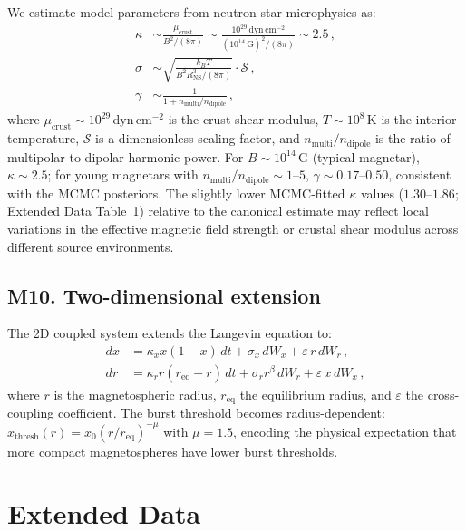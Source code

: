 \documentclass[twocolumn]{article}
\begin{document}
We estimate model parameters from neutron star microphysics as:
\begin{align}
\kappa &\sim \frac{\mu_{\mathrm{crust}}}{B^2/(8\pi)} \sim \frac{10^{29}\,\mathrm{dyn\,cm^{-2}}}{(10^{14}\,\mathrm{G})^2/(8\pi)} \sim 2.5\,,
\tag{M9}\\
\sigma &\sim \sqrt{\frac{k_B T}{B^2 R_{\mathrm{NS}}^3 /(8\pi)}} \cdot \mathcal{S}\,,
\tag{M10}\\
\gamma &\sim \frac{1}{1 + n_{\mathrm{multi}}/n_{\mathrm{dipole}}}\,,
\tag{M11}
\end{align}
where $\mu_{\mathrm{crust}} \sim 10^{29}$\,dyn\,cm$^{-2}$ is the crust shear modulus, $T \sim 10^8$\,K is the interior temperature, $\mathcal{S}$ is a dimensionless scaling factor, and $n_{\mathrm{multi}}/n_{\mathrm{dipole}}$ is the ratio of multipolar to dipolar harmonic power. For $B \sim 10^{14}$\,G (typical magnetar), $\kappa \sim 2.5$; for young magnetars with $n_{\mathrm{multi}}/n_{\mathrm{dipole}} \sim 1$--$5$, $\gamma \sim 0.17$--$0.50$, consistent with the MCMC posteriors. The slightly lower MCMC-fitted $\kappa$ values ($1.30$--$1.86$; Extended Data Table~1) relative to the canonical estimate may reflect local variations in the effective magnetic field strength or crustal shear modulus across different source environments.

\subsection*{M10. Two-dimensional extension}

The 2D coupled system extends the Langevin equation to:
\begin{align}
dx &= \kappa_x x(1-x)\,dt + \sigma_x\,dW_x + \varepsilon\,r\,dW_r\,,
\tag{M12}\\
dr &= \kappa_r r(r_{\mathrm{eq}} - r)\,dt + \sigma_r r^\beta\,dW_r + \varepsilon\,x\,dW_x\,,
\tag{M13}
\end{align}
where $r$ is the magnetospheric radius, $r_{\mathrm{eq}}$ the equilibrium radius, and $\varepsilon$ the cross-coupling coefficient. The burst threshold becomes radius-dependent: $x_{\mathrm{thresh}}(r) = x_0(r/r_{\mathrm{eq}})^{-\mu}$ with $\mu = 1.5$, encoding the physical expectation that more compact magnetospheres have lower burst thresholds.


\clearpage

\section*{Extended Data}
\end{document}

